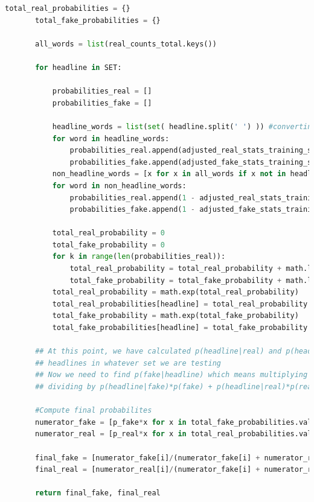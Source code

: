 \documentclass{article}
\begin{document}
\begin{enumerate}
\begin{lstlisting}[language=Python]
       total_real_probabilities = {}
       total_fake_probabilities = {}

       all_words = list(real_counts_total.keys())

       for headline in SET:

           probabilities_real = []
           probabilities_fake = []

           headline_words = list(set( headline.split(' ') )) #converting to set and back to a list removes duplicates
           for word in headline_words:
               probabilities_real.append(adjusted_real_stats_training_set.get(word))
               probabilities_fake.append(adjusted_fake_stats_training_set.get(word))
           non_headline_words = [x for x in all_words if x not in headline_words]
           for word in non_headline_words:
               probabilities_real.append(1 - adjusted_real_stats_training_set.get(word))
               probabilities_fake.append(1 - adjusted_fake_stats_training_set.get(word))

           total_real_probability = 0
           total_fake_probability = 0
           for k in range(len(probabilities_real)):
               total_real_probability = total_real_probability + math.log(probabilities_real[k])
               total_fake_probability = total_fake_probability + math.log(probabilities_fake[k])
           total_real_probability = math.exp(total_real_probability)
           total_real_probabilities[headline] = total_real_probability
           total_fake_probability = math.exp(total_fake_probability)
           total_fake_probabilities[headline] = total_fake_probability

       ## At this point, we have calculated p(headline|real) and p(headline|fake) for all
       ## headlines in whatever set we are testing
       ## Now we need to find p(fake|headline) which means multiplying p(headline|fake) by p(fake) and
       ## dividing by p(headline|fake)*p(fake) + p(headline|real)*p(real)

       #Compute final probabilites
       numerator_fake = [p_fake*x for x in total_fake_probabilities.values()]
       numerator_real = [p_real*x for x in total_real_probabilities.values()]

       final_fake = [numerator_fake[i]/(numerator_fake[i] + numerator_real[i]) for i in range(len(numerator_fake))]
       final_real = [numerator_real[i]/(numerator_fake[i] + numerator_real[i]) for i in range(len(numerator_real))]

       return final_fake, final_real
     \end{lstlisting}


\end{enumerate}
\end{document}
